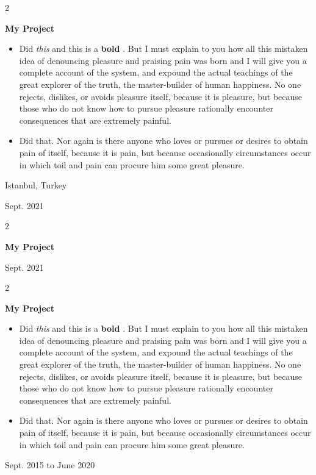 \documentclass[10pt, letterpaper]{article}
\newenvironment{highlights}{
    \begin{itemize}[
        topsep=0.10 cm,
        parsep=0.10 cm,
        partopsep=0pt,
        itemsep=0pt,
        leftmargin=0.4 cm + 10pt
    ]
}{
    \end{itemize}
} %
\newenvironment{twocolentry}[2][]{
    \onecolentry
    \def\secondColumn{#2}
    \setcolumnwidth{\fill, 4.5 cm}
    \begin{paracol}{2}
}{
    \switchcolumn \raggedleft \secondColumn
    \end{paracol}
    \endonecolentry
} %
\let\hrefWithoutArrow\href
\renewcommand{\href}[2]{\hrefWithoutArrow{#1}{\mbox{\ifthenelse{\equal{#2}{}}{ }{#2 }\raisebox{.15ex}{\footnotesize \faExternalLink*}}}}
\begin{document}
        \vspace{0.2 cm}

        \begin{twocolentry}{
            Istanbul, Turkey

        Sept. 2021
        }
            \textbf{My Project}
            \begin{highlights}
                \item Did \textit{this} and this is a \textbf{bold} \href{https://example.com}{link}. But I must explain to you how all this mistaken idea of denouncing pleasure and praising pain was born and I will give you a complete account of the system, and expound the actual teachings of the great explorer of the truth, the master-builder of human happiness. No one rejects, dislikes, or avoids pleasure itself, because it is pleasure, but because those who do not know how to pursue pleasure rationally encounter consequences that are extremely painful.
                \item Did that. Nor again is there anyone who loves or pursues or desires to obtain pain of itself, because it is pain, but because occasionally circumstances occur in which toil and pain can procure him some great pleasure.
            \end{highlights}
        \end{twocolentry}


        \vspace{0.2 cm}

        \begin{twocolentry}{
            Sept. 2021
        }
            \textbf{My Project}
        \end{twocolentry}


        \vspace{0.2 cm}

        \begin{twocolentry}{
            Sept. 2015 to June 2020
        }
            \textbf{My Project}
            \begin{highlights}
                \item Did \textit{this} and this is a \textbf{bold} \href{https://example.com}{link}. But I must explain to you how all this mistaken idea of denouncing pleasure and praising pain was born and I will give you a complete account of the system, and expound the actual teachings of the great explorer of the truth, the master-builder of human happiness. No one rejects, dislikes, or avoids pleasure itself, because it is pleasure, but because those who do not know how to pursue pleasure rationally encounter consequences that are extremely painful.
                \item Did that. Nor again is there anyone who loves or pursues or desires to obtain pain of itself, because it is pain, but because occasionally circumstances occur in which toil and pain can procure him some great pleasure.
            \end{highlights}
        \end{twocolentry}
\end{document}
